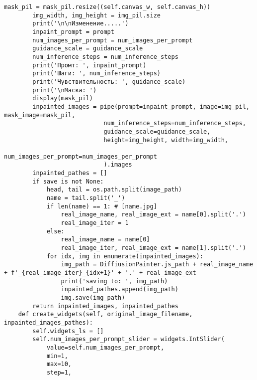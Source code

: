 \begin{lstlisting}[basicstyle=\ttfamily\small]
        mask_pil = mask_pil.resize((self.canvas_w, self.canvas_h))
        img_width, img_height = img_pil.size
        print('\n\nИзменение.....')
        inpaint_prompt = prompt
        num_images_per_prompt = num_images_per_prompt
        guidance_scale = guidance_scale
        num_inference_steps = num_inference_steps
        print('Промт: ', inpaint_prompt)
        print('Шаги: ', num_inference_steps)
        print('Чувствительность: ', guidance_scale)
        print('\nМаска: ')
        display(mask_pil)
        inpainted_images = pipe(prompt=inpaint_prompt, image=img_pil, mask_image=mask_pil,
                            num_inference_steps=num_inference_steps,
                            guidance_scale=guidance_scale,
                            height=img_height, width=img_width,
                            num_images_per_prompt=num_images_per_prompt
                            ).images
        inpainted_pathes = []
        if save is not None:
            head, tail = os.path.split(image_path)
            name = tail.split('_')
            if len(name) == 1: # [name.jpg]
                real_image_name, real_image_ext = name[0].split('.')
                real_image_iter = 1
            else:
                real_image_name = name[0]
                real_image_iter, real_image_ext = name[1].split('.')
            for idx, img in enumerate(inpainted_images):
                img_path = DiffiusionPainter.js_path + real_image_name + f'_{real_image_iter}_{idx+1}' + '.' + real_image_ext
                print('saving to: ', img_path)
                inpainted_pathes.append(img_path)
                img.save(img_path)
        return inpainted_images, inpainted_pathes
    def create_widgets(self, original_image_filename, inpainted_images_pathes):
        self.widgets_ls = []
        self.num_images_per_prompt_slider = widgets.IntSlider(
            value=self.num_images_per_prompt,
            min=1,
            max=10,
            step=1,
            \end{lstlisting}
